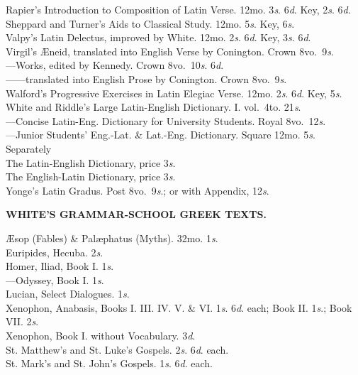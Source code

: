 \documentclass[letterpaper,12pt,oneside,openany]{memoir}
\newcommand{\D}{\hspace*{5mm}}
\newcommand{\E}{\hspace*{2mm}---\hspace*{2mm}}
\begin{document}
\begin{footnotesize}
Rapier's Introduction to Composition of Latin Verse. 12mo. 3\textit{s}. 6\textit{d}. Key, 2\textit{s}. 6\textit{d}.\\
Sheppard and Turner's Aids to Classical Study. 12mo. 5\textit{s}. Key, 6\textit{s}.\\
Valpy's Latin Delectus, improved by White. 12mo. 2\textit{s}. 6\textit{d}. Key, 3\textit{s}. 6\textit{d}.\\
Virgil's {\AE}neid, translated into English Verse by Conington. Crown 8vo.\ 9\textit{s}.\\
\E  Works, edited by Kennedy. Crown 8vo.\ 10\textit{s}. 6\textit{d}.\\
\E \E \D translated into English Prose by Conington. Crown 8vo.\ 9\textit{s}.\\
Walford's Progressive Exercises in Latin Elegiac Verse. 12mo. 2\textit{s}. 6\textit{d}. Key, 5\textit{s}.\\
White and Riddle's Large Latin-English Dictionary. I. vol.\ 4to. 21\textit{s}.\\
\E  Concise Latin-Eng. Dictionary for University Students. Royal 8vo.\ 12\textit{s}.\\
\E  Junior Students' Eng.-Lat. \& Lat.-Eng. Dictionary. Square 12mo. 5\textit{s}. Separately\\
\D \D The Latin-English Dictionary, price 3\textit{s}.\\
\D \D The English-Latin Dictionary, price 3\textit{s}.\\
Yonge's Latin Gradus. Post 8vo.\ 9\textit{s}.; or with Appendix, 12\textit{s}.
\begin{center}
\textbf{WHITE'S GRAMMAR-SCHOOL GREEK TEXTS.}
\end{center}
{\AE}sop (Fables) \& Pal{\ae}phatus (Myths). 32mo. 1\textit{s}.\\
Euripides, Hecuba. 2\textit{s}.\\
Homer, Iliad, Book I. 1\textit{s}.\\
\E Odyssey, Book I. 1\textit{s}.\\
Lucian, Select Dialogues. 1\textit{s}.\\
Xenophon, Anabasis, Books I\@. III\@. IV\@. V\@. \& VI. 1\textit{s}.
6\textit{d}. each; Book II. 1\textit{s}.; Book VII. 2\textit{s}.\\
Xenophon, Book I. without Vocabulary.   3\textit{d}.\\
St. Matthew's and St. Luke's Gospels. 2\textit{s}. 6\textit{d}. each.\\
St. Mark's and St. John's Gospels. 1\textit{s}. 6\textit{d}. each.\\

\end{footnotesize}
\end{document}
